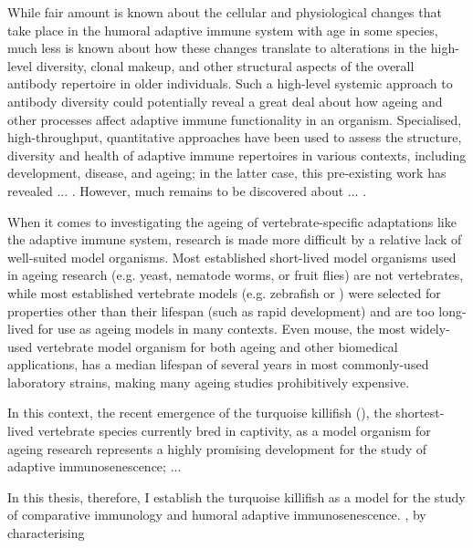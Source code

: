 While fair amount is known about the cellular and physiological changes that take place in the humoral adaptive immune system with age in some species, much less is known about how these changes translate to alterations in the high-level diversity, clonal makeup, and other structural aspects of the overall antibody repertoire in older individuals. Such a high-level systemic approach to antibody diversity could potentially reveal a great deal about how ageing and other processes affect adaptive immune functionality in an organism. Specialised, high-throughput, quantitative approaches have been used to assess the structure, diversity and health of adaptive immune repertoires in various contexts, including development, disease, and ageing; in the latter case, this pre-existing work has revealed ... . However, much remains to be discovered about ... .

When it comes to investigating the ageing of vertebrate-specific adaptations like the adaptive immune system, research is made more difficult by a relative lack of well-suited model organisms. Most established short-lived model organisms used in ageing research (e.g. yeast, nematode worms, or fruit flies) are not vertebrates, while most established vertebrate models (e.g. zebrafish or ) were selected for properties other than their lifespan (such as rapid development) and are too long-lived for use as ageing models in many contexts. Even mouse, the most widely-used vertebrate model organism for both ageing and other biomedical applications, has a median lifespan of several years in most commonly-used laboratory strains, making many ageing studies prohibitively expensive. 

In this context, the recent emergence of the turquoise killifish (\nfu), the shortest-lived vertebrate species currently bred in captivity, as a model organism for ageing research represents a highly promising development for the study of adaptive immunosenescence; ...

In this thesis, therefore, I establish the turquoise killifish as a model for the study of comparative immunology and humoral adaptive immunosenescence. 
, by characterising 

